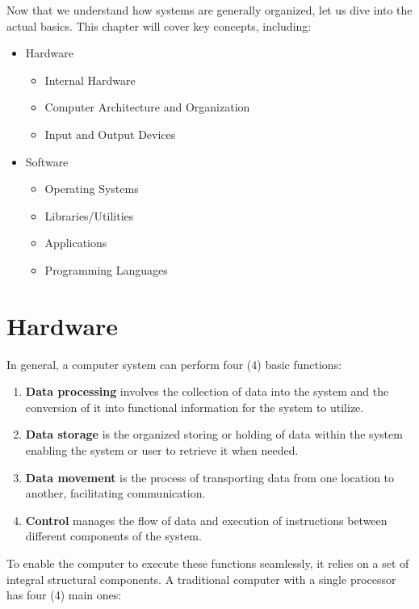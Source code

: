 \documentclass[
  letterpaper,
  DIV=11,
  numbers=noendperiod]{scrreprt}
\providecommand{\tightlist}{%
  \setlength{\itemsep}{0pt}\setlength{\parskip}{0pt}}\usepackage{longtable,booktabs,array}
\begin{document}
Now that we understand how systems are generally organized, let us dive
into the actual basics. This chapter will cover key concepts, including:

\begin{itemize}
\tightlist
\item
  Hardware

  \begin{itemize}
  \tightlist
  \item
    Internal Hardware
  \item
    Computer Architecture and Organization
  \item
    Input and Output Devices
  \end{itemize}
\item
  Software

  \begin{itemize}
  \tightlist
  \item
    Operating Systems
  \item
    Libraries/Utilities
  \item
    Applications
  \item
    Programming Languages
  \end{itemize}
\end{itemize}

\section{Hardware}\label{hardware}

In general, a computer system can perform four (4) basic functions:

\begin{enumerate}
\def\labelenumi{\arabic{enumi}.}
\tightlist
\item
  \textbf{Data processing} involves the collection of data into the
  system and the conversion of it into functional information for the
  system to utilize.
\item
  \textbf{Data storage} is the organized storing or holding of data
  within the system enabling the system or user to retrieve it when
  needed.
\item
  \textbf{Data movement} is the process of transporting data from one
  location to another, facilitating communication.
\item
  \textbf{Control} manages the flow of data and execution of
  instructions between different components of the system.
\end{enumerate}

To enable the computer to execute these functions seamlessly, it relies
on a set of integral structural components. A traditional computer with
a single processor has four (4) main ones:
\end{document}
